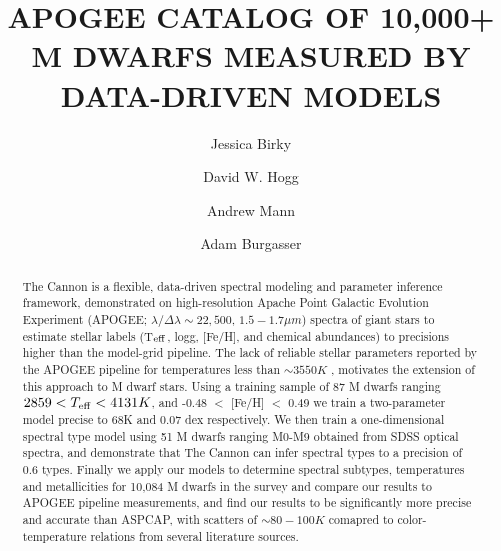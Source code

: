 \documentclass[modern]{aastex62}
\begin{document}
\title{APOGEE CATALOG OF 10,000+ M DWARFS MEASURED BY DATA-DRIVEN MODELS}


\author[0000-0002-7961-6881]{Jessica Birky}

\author[0000-0003-2866-9403]{David W. Hogg}

\author[0000-0003-3654-1602]{Andrew Mann}

\author[0000-0002-6523-9536]{Adam Burgasser}

\begin{abstract}

The Cannon \citep{Ness:2015} is a flexible, data-driven spectral modeling and parameter inference framework, demonstrated on high-resolution Apache Point Galactic Evolution Experiment (APOGEE; $\lambda/\Delta\lambda\sim22,500$, $1.5-1.7 \mu m$) spectra of giant stars to estimate stellar labels (T$_{\rm eff}$, logg, [Fe/H], and chemical abundances) to precisions higher than the model-grid pipeline. The lack of reliable stellar parameters reported by the APOGEE pipeline for temperatures less than $\sim3550K$ \citep{Schmidt:2016}, motivates the extension of this approach to M dwarf stars. Using a training sample of 87 M dwarfs ranging $2859 < T_{\rm eff} < 4131K$, and -0.48 $<$ [Fe/H] $<$ 0.49 we train a two-parameter model precise to 68K and 0.07 dex respectively. We then train a one-dimensional spectral type model using 51 M dwarfs ranging M0-M9 obtained from SDSS optical spectra, and demonstrate that The Cannon can infer spectral types to a precision of 0.6 types. Finally we apply our models to determine spectral subtypes, temperatures and metallicities for 10,084 M dwarfs in the survey and compare our results to APOGEE pipeline measurements, and find our results to be significantly more precise and accurate than ASPCAP, with scatters of $\sim80-100K$ comapred to color-temperature relations from several literature sources.

\end{abstract}
\end{document}
